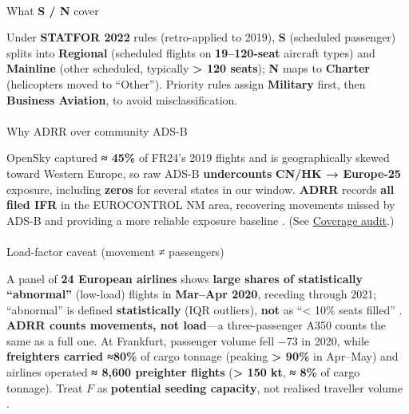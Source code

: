 \documentclass[
  authoryear,
  preprint,
  3p,
  onecolumn]{elsarticle}
\makeatletter
\let\oldparagraph\paragraph
\renewcommand{\paragraph}{
    \@ifstar
      \xxxParagraphStar
      \xxxParagraphNoStar
  }
\newcommand{\xxxParagraphStar}[1]{\oldparagraph*{#1}\mbox{}}
\newcommand{\xxxParagraphNoStar}[1]{\oldparagraph{#1}\mbox{}}
\makeatother
\begin{document}
\paragraph{\texorpdfstring{What \textbf{S / N}
cover}{What S / N cover}}\label{what-s-n-cover}

Under \textbf{STATFOR 2022} rules (retro-applied to 2019), \textbf{S}
(scheduled passenger) splits into \textbf{Regional} (scheduled flights
on \textbf{19--120-seat} aircraft types) and \textbf{Mainline} (other
scheduled, typically \textbf{\textgreater{} 120 seats}); \textbf{N} maps
to \textbf{Charter} (helicopters moved to ``Other''). Priority rules
assign \textbf{Military} first, then \textbf{Business Aviation}, to
avoid misclassification. \citep{eurocontrol2022seg}

\paragraph{Why ADRR over community
ADS-B}\label{why-adrr-over-community-ads-b}

OpenSky captured \textbf{≈ 45\%} of FR24's 2019 flights and is
geographically skewed toward Western Europe, so raw ADS-B
\textbf{undercounts} \textbf{CN/HK → Europe-25} exposure, including
\textbf{zeros} for several states in our window. \textbf{ADRR} records
\textbf{all filed IFR} in the EUROCONTROL NM area, recovering movements
missed by ADS-B and providing a more reliable exposure baseline
\citep{strohmeier2021}. (See \hyperref[coverage-audit]{Coverage audit}.)

\paragraph{Load-factor caveat (movement ≠
passengers)}\label{load-factor-caveat-movement-passengers}

A panel of \textbf{24 European airlines} shows \textbf{large shares of
statistically ``abnormal''} (low-load) flights in \textbf{Mar--Apr
2020}, receding through 2021; ``abnormal'' is defined
\textbf{statistically} (IQR outliers), \textbf{not} as ``\textless{}
10\% seats filled'' \citep{sun2022_b}. \textbf{ADRR counts movements,
not load}---a three-passenger A350 counts the same as a full one. At
Frankfurt, passenger volume fell \(-73%
\) in 2020, while \textbf{freighters carried ≈80\%} of cargo tonnage
(peaking \textbf{\textgreater{} 90\%} in Apr--May) and airlines operated
\textbf{≈ 8,600 preighter flights} (\textbf{\textgreater{} 150 kt},
\textbf{≈ 8\%} of cargo tonnage). Treat \(F\) as \textbf{potential
seeding capacity}, not realised traveller volume \citep{fraport2021}.
\end{document}
